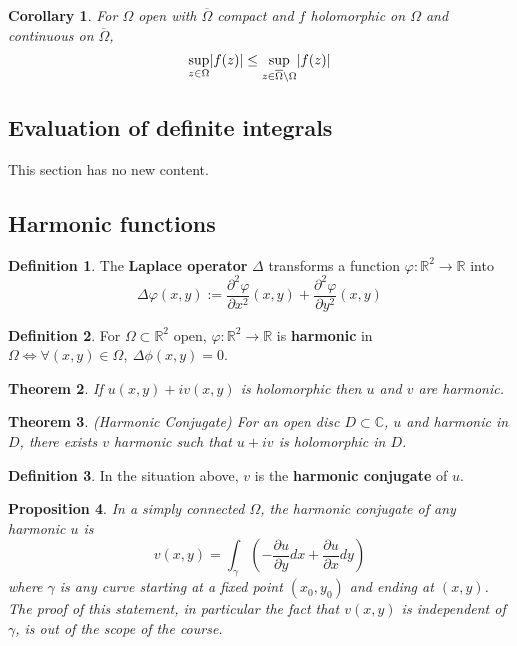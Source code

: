 \documentclass[12pt]{article}
\newtheorem{thm}{Theorem}[section]
\newtheorem{cor}[thm]{Corollary}
\newtheorem{prop}[thm]{Proposition}
\theoremstyle{definition}
\newtheorem{defn}{Definition}[section]
\newcommand{\C}{\mathbb{C}}
\newcommand{\R}{\mathbb{R}}
\DeclarePairedDelimiter\abs{\lvert}{\rvert}
\begin{document}
\begin{cor}
  For $\Omega$ open with $\overline{\Omega}$ compact and $f$ holomorphic on $\Omega$ and continuous on $\overline{\Omega}$,
  $$\sup_{z \in \Omega}\abs{f(z)} \leq \sup_{z \in \overline{\Omega} \setminus \Omega}\abs{f(z)}$$
\end{cor}

\subsection{Evaluation of definite integrals}

This section has no new content.

\subsection{Harmonic functions}

\begin{defn}
  The \textbf{Laplace operator} $\Delta$ transforms a function $\varphi : \R^2 \to \R$ into
  $$\Delta\varphi(x, y) := \frac{\partial^2\varphi}{\partial x^2}(x, y) + \frac{\partial^2\varphi}{\partial y^2}(x, y)$$
\end{defn}

\begin{defn}
  For $\Omega \subset \R^2$ open, $\varphi : \R^2 \to \R$ is \textbf{harmonic} in $\Omega \iff \forall (x, y) \in \Omega,\ \Delta\phi(x, y) = 0$.
\end{defn}

\begin{thm}
  If $u(x, y) + iv(x, y)$ is holomorphic then $u$ and $v$ are harmonic.
\end{thm}

\begin{thm}
  (Harmonic Conjugate)
  For an open disc $D \subset \C$, $u$ and harmonic in $D$, there exists $v$ harmonic such that $u + iv$ is holomorphic in $D$.
\end{thm}

\begin{defn}
  In the situation above, $v$ is the \textbf{harmonic conjugate} of $u$.
\end{defn}

\begin{prop}
  In a simply connected $\Omega$, the harmonic conjugate of any harmonic $u$ is
  $$v(x, y) = \int_{\gamma}\left(-\frac{\partial u}{\partial y}dx + \frac{\partial u}{\partial x}dy\right)$$
  where $\gamma$ is any curve starting at a fixed point $(x_0, y_0)$ and ending at $(x, y)$.
  The proof of this statement, in particular the fact that $v(x, y)$ is independent of $\gamma$, is out of the scope of the course.
\end{prop}
\end{document}
